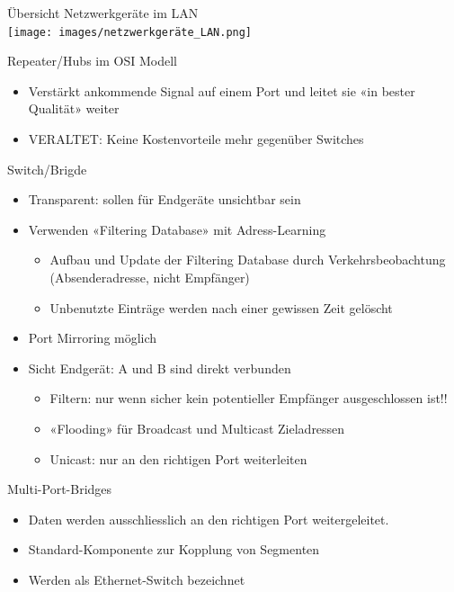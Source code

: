 \begin{definition}{Übersicht Netzwerkgeräte im LAN}\\
    \texttt{[image: images/netzwerkgeräte\_LAN.png]}
\end{definition}


\begin{definition}{Repeater/Hubs im OSI Modell}
    \begin{itemize}
        \item Verstärkt ankommende Signal auf einem Port und leitet sie «in bester Qualität» weiter
        \item VERALTET: Keine Kostenvorteile mehr gegenüber Switches
    \end{itemize}
\end{definition}

\begin{definition}{Switch/Brigde}
    \begin{itemize}
        \item Transparent: sollen für Endgeräte unsichtbar sein
        \item Verwenden «Filtering Database» mit Adress-Learning
        \begin{itemize}
            \item Aufbau und Update der Filtering Database durch Verkehrsbeobachtung (Absenderadresse, nicht Empfänger)
            \item Unbenutzte Einträge werden nach einer gewissen Zeit gelöscht
        \end{itemize}
        \item Port Mirroring möglich
        \item Sicht Endgerät: A und B sind direkt verbunden
        \begin{itemize}
            \item Filtern: nur wenn sicher kein potentieller Empfänger ausgeschlossen ist!!
            \item «Flooding» für Broadcast und Multicast Zieladressen
            \item Unicast: nur an den richtigen Port weiterleiten
        \end{itemize}
    \end{itemize}
\end{definition}

\begin{definition}{Multi-Port-Bridges}
    \begin{itemize}
        \item Daten werden ausschliesslich an den richtigen Port weitergeleitet.
        \item Standard-Komponente zur Kopplung von Segmenten
        \item Werden als Ethernet-Switch bezeichnet
    \end{itemize}
\end{definition}

